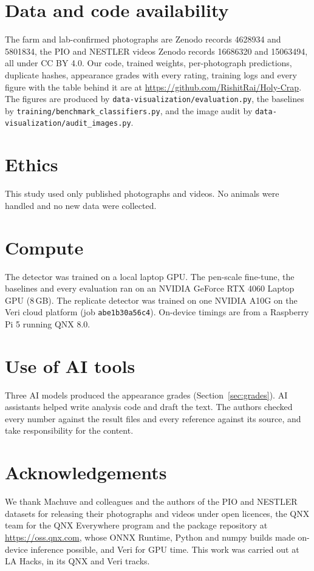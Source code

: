 \documentclass[10pt,twocolumn]{article}
\begin{document}
\section*{Data and code availability}
The farm and lab-confirmed photographs are Zenodo records 4628934 and 5801834, the PIO and NESTLER videos Zenodo
records 16686320 and 15063494, all under CC BY 4.0. Our code, trained weights, per-photograph predictions,
duplicate hashes, appearance grades with every rating, training logs and every figure with the table behind it are at
\url{https://github.com/RishitRai/Holy-Crap}. The figures
are produced by \texttt{data-visualization/evaluation.py}, the baselines by
\texttt{training/benchmark\_classifiers.py}, and the image audit by \texttt{data-visualization/audit\_images.py}.

\section*{Ethics}
This study used only published photographs and videos. No animals were handled and no new data were collected.

\section*{Compute}
The detector was trained on a local laptop GPU. The pen-scale fine-tune, the baselines and every evaluation ran on an
NVIDIA GeForce RTX 4060 Laptop GPU (8\,GB). The replicate detector was trained on one NVIDIA A10G on the Veri cloud
platform (job \texttt{abe1b30a56c4}). On-device timings are from a Raspberry Pi 5 running QNX 8.0.

\section*{Use of AI tools}
Three AI models produced the appearance grades (Section~\ref{sec:grades}). AI assistants helped write analysis code
and draft the text. The authors checked every number against the result files and every reference against its
source, and take responsibility for the content.

\section*{Acknowledgements}
We thank Machuve and colleagues and the authors of the PIO and NESTLER datasets for releasing their photographs and
videos under open licences, the QNX team for the QNX Everywhere program and the package repository at
\url{https://oss.qnx.com}, whose ONNX Runtime, Python and numpy builds made on-device inference possible, and Veri for
GPU time. This work was carried out at LA Hacks, in its QNX and Veri tracks.

\clearpage


\end{document}
